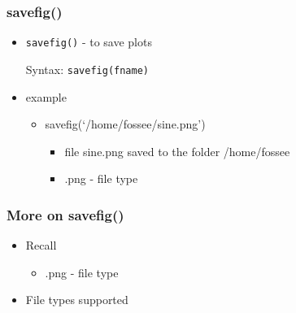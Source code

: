 \documentclass[17pt,compress]{beamer}
\begin{document}
\begin{frame}[fragile]
\frametitle{savefig()}
\label{sec-5}
\begin{itemize}
\item \texttt{savefig()} - to save plots\pause
\label{sec-5_1}%

Syntax: \texttt{savefig(fname)}\pause

\item example
\label{sec-5_2}%
\begin{itemize}
\item savefig(`/home/fossee/sine.png')\\\pause
\label{sec-5_2_1}%
\begin{itemize}
\item file sine.png saved to the folder /home/fossee\pause
\item .png - file type
\end{itemize}
\end{itemize} %
\end{itemize} %
\end{frame}
\begin{frame}
\frametitle{More on savefig()}
\label{sec-6}
\begin{itemize}
\item Recall\\
\label{sec-6_1}%
\begin{itemize}
\item .png - file type\pause
\end{itemize}
\item File types supported\pause
\label{sec-6_2}%
\begin{itemize}

\end{itemize} %
\end{itemize} %
\end{frame}
\end{document}
